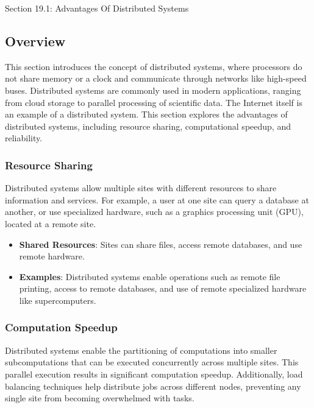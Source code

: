 \begin{notes}{Section 19.1: Advantages Of Distributed Systems}
    \subsection*{Overview}

    This section introduces the concept of distributed systems, where processors do not share memory or a clock and communicate through networks like high-speed buses. Distributed systems are commonly 
    used in modern applications, ranging from cloud storage to parallel processing of scientific data. The Internet itself is an example of a distributed system. This section explores the advantages 
    of distributed systems, including resource sharing, computational speedup, and reliability.
    
    \subsubsection*{Resource Sharing}
    
    Distributed systems allow multiple sites with different resources to share information and services. For example, a user at one site can query a database at another, or use specialized hardware, 
    such as a graphics processing unit (GPU), located at a remote site.
    
    \begin{highlight}
    
        \begin{itemize}
            \item \textbf{Shared Resources}: Sites can share files, access remote databases, and use remote hardware.
            \item \textbf{Examples}: Distributed systems enable operations such as remote file printing, access to remote databases, and use of remote specialized hardware like supercomputers.
        \end{itemize}
    
    \end{highlight}
    
    \subsubsection*{Computation Speedup}
    
    Distributed systems enable the partitioning of computations into smaller subcomputations that can be executed concurrently across multiple sites. This parallel execution results in significant 
    computation speedup. Additionally, load balancing techniques help distribute jobs across different nodes, preventing any single site from becoming overwhelmed with tasks.
    

\end{notes}
